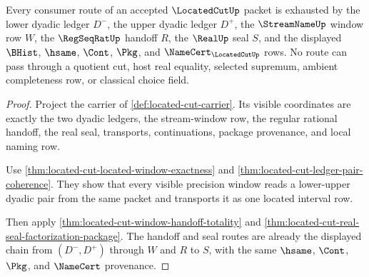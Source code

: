 \begin{theorem}
\label{thm:located-cut-scoped-kernel-route}
Every consumer route of an accepted $\LocatedCutUp$ packet is exhausted by the lower dyadic ledger $D^{-}$, the upper dyadic ledger $D^{+}$, the $\StreamNameUp$ window row $W$, the $\RegSeqRatUp$ handoff $R$, the $\RealUp$ seal $S$, and the displayed $\BHist$, $\hsame$, $\Cont$, $\Pkg$, and $\NameCert_{\LocatedCutUp}$ rows. No route can pass through a quotient cut, host real equality, selected supremum, ambient completeness row, or classical choice field.
\end{theorem}
\begin{proof}
Project the carrier of \autoref{def:located-cut-carrier}. Its visible coordinates are exactly the two dyadic ledgers, the stream-window row, the regular rational handoff, the real seal, transports, continuations, package provenance, and local naming row.

Use \autoref{thm:located-cut-located-window-exactness} and \autoref{thm:located-cut-ledger-pair-coherence}. They show that every visible precision window reads a lower-upper dyadic pair from the same packet and transports it as one located interval row.

Then apply \autoref{thm:located-cut-window-handoff-totality} and \autoref{thm:located-cut-real-seal-factorization-package}. The handoff and seal routes are already the displayed chain from $(D^{-},D^{+})$ through $W$ and $R$ to $S$, with the same $\hsame$, $\Cont$, $\Pkg$, and $\NameCert$ provenance.
\end{proof}

